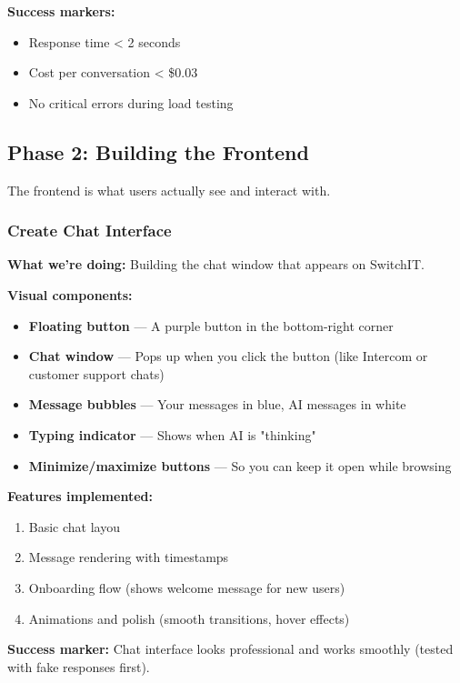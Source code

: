 \documentclass[12pt,a4paper]{article}
\begin{document}
\textbf{Success markers:}
\begin{itemize}
  \item Response time < 2 seconds
  \item Cost per conversation < \$0.03
  \item No critical errors during load testing
\end{itemize}

\subsection{Phase 2: Building the Frontend}

The frontend is what users actually see and interact with.

\subsubsection{Create Chat Interface }

\textbf{What we're doing:} Building the chat window that appears on SwitchIT.

\textbf{Visual components:}
\begin{itemize}
  \item \textbf{Floating button} — A purple button in the bottom-right corner
  \item \textbf{Chat window} — Pops up when you click the button (like Intercom or customer support chats)
  \item \textbf{Message bubbles} — Your messages in blue, AI messages in white
  \item \textbf{Typing indicator} — Shows when AI is "thinking"
  \item \textbf{Minimize/maximize buttons} — So you can keep it open while browsing
\end{itemize}

\textbf{Features implemented:}
\begin{enumerate}
  \item Basic chat layou
  \item Message rendering with timestamps
  \item Onboarding flow (shows welcome message for new users)
  \item Animations and polish (smooth transitions, hover effects)
\end{enumerate}

\textbf{Success marker:} Chat interface looks professional and works smoothly (tested with fake responses first).
\end{document}
